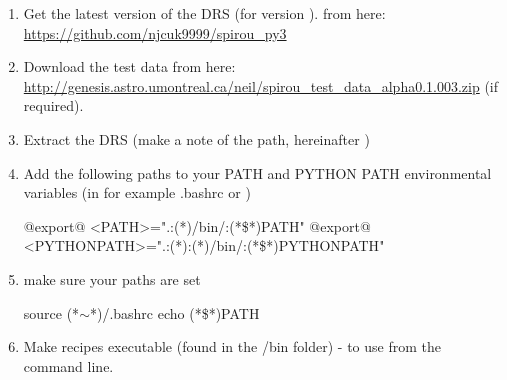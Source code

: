 \begin{enumerate}

\item Get the latest version of the DRS (for \instrument version \MyCodeVersion). from here: \url{https://github.com/njcuk9999/spirou_py3}

\item Download the test data from here: \url{http://genesis.astro.umontreal.ca/neil/spirou_test_data_alpha0.1.003.zip} (if required).

\item Extract the DRS (make a note of the path, hereinafter \InstallDIR)

\item Add the following paths to your PATH and PYTHON PATH environmental variables (in for example .bashrc or )

	\begin{bashbox}[title={e.g. in $\sim$/.bashrc or $\sim$/.bash\_profile}]
	@export@ <PATH>=".:(*\InstallDIR*)/bin/:{(*\$*)PATH}"
	@export@ <PYTHONPATH>=".:(*\InstallDIR*):(*\InstallDIR*)/bin/:{(*\$*)PYTHONPATH}"
	\end{bashbox}

\item make sure your paths are set
	\begin{cmdbox}
	source (*$\sim$*)/.bashrc
	echo (*\$*)PATH
	\end{cmdbox}

\item Make recipes executable (found in the \InstallDIR/bin folder) - to use from the command line.


\end{enumerate}
